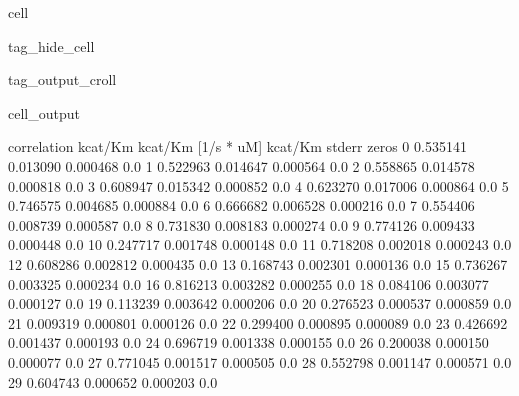 \documentclass[letterpaper,12pt,english]{jupyterBook}
\begin{document}
\begin{sphinxuseclass}{cell}
\begin{sphinxuseclass}{tag_hide_cell}
\begin{sphinxuseclass}{tag_output_croll}
\begin{sphinxVerbatimOutput}
\begin{sphinxuseclass}{cell_output}
\begin{sphinxVerbatim}[commandchars=\\\{\}]
    correlation kcat/Km  kcat/Km [1/s * uM]  kcat/Km stderr  zeros  \PYGZbs{}
0              0.535141            0.013090        0.000468    0.0   
1              0.522963            0.014647        0.000564    0.0   
2              0.558865            0.014578        0.000818    0.0   
3              0.608947            0.015342        0.000852    0.0   
4              0.623270            0.017006        0.000864    0.0   
5              0.746575            0.004685        0.000884    0.0   
6              0.666682            0.006528        0.000216    0.0   
7              0.554406            0.008739        0.000587    0.0   
8              0.731830            0.008183        0.000274    0.0   
9              0.774126            0.009433        0.000448    0.0   
10             0.247717            0.001748        0.000148    0.0   
11            \PYGZhy{}0.718208            0.002018        0.000243    0.0   
12             0.608286            0.002812        0.000435    0.0   
13             0.168743            0.002301        0.000136    0.0   
15            \PYGZhy{}0.736267            0.003325        0.000234    0.0   
16             0.816213            0.003282        0.000255    0.0   
18             0.084106            0.003077        0.000127    0.0   
19            \PYGZhy{}0.113239            0.003642        0.000206    0.0   
20             0.276523            0.000537        0.000859    0.0   
21             0.009319            0.000801        0.000126    0.0   
22             0.299400            0.000895        0.000089    0.0   
23            \PYGZhy{}0.426692            0.001437        0.000193    0.0   
24            \PYGZhy{}0.696719            0.001338        0.000155    0.0   
26            \PYGZhy{}0.200038            0.000150        0.000077    0.0   
27             0.771045            0.001517        0.000505    0.0   
28             0.552798            0.001147        0.000571    0.0   
29             0.604743            0.000652        0.000203    0.0   


\end{sphinxVerbatim}
\end{sphinxuseclass}
\end{sphinxVerbatimOutput}
\end{sphinxuseclass}
\end{sphinxuseclass}
\end{sphinxuseclass}
\end{document}
